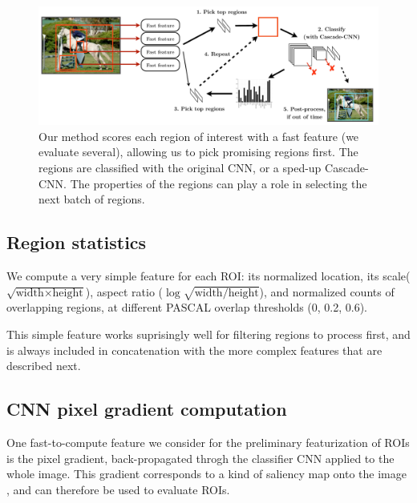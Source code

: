 \begin{figure}[h!]
\begin{center}
\includegraphics[width=0.98\columnwidth]{figures/combined.pdf}
\caption{
Our method scores each region of interest with a fast feature (we evaluate several), allowing us to pick promising regions first.
The regions are classified with the original CNN, or a sped-up Cascade-CNN.
The properties of the regions can play a role in selecting the next batch of regions.
}\label{fig:combined}
\end{center}
\end{figure}

\subsection{Region statistics}\label{sec:region}

We compute a very simple feature for each ROI: its normalized location,
its scale($\sqrt{\text{width} \times \text{height}}$),
aspect ratio ($\log \sqrt{\text{width} / \text{height}}$),
and normalized counts of overlapping regions, at different PASCAL overlap  thresholds (0, 0.2, 0.6).

This simple feature works suprisingly well for filtering regions to process first, and is always included in concatenation with the more complex features that are described next.

\subsection{CNN pixel gradient computation}\label{sec:gradient}

One fast-to-compute feature we consider for the preliminary featurization of ROIs is the pixel gradient, back-propagated throgh the classifier CNN applied to the whole image.
This gradient corresponds to a kind of saliency map onto the image \cite{Simonyan-ICLR-2014}, and can therefore be used to evaluate ROIs.

